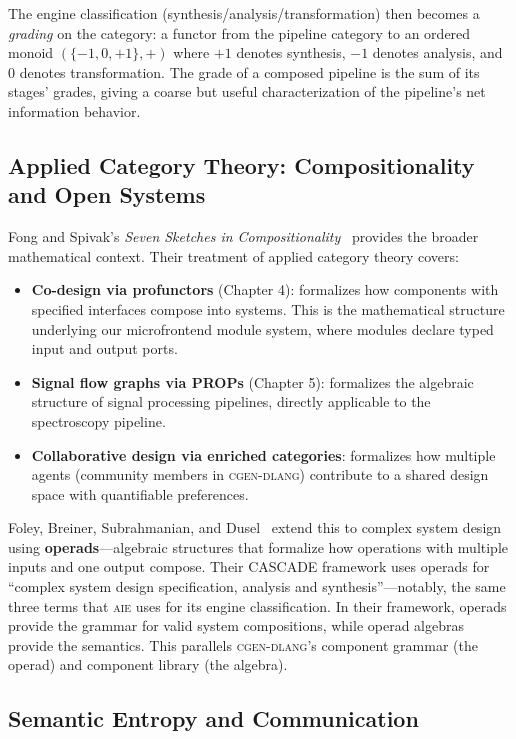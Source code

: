 \documentclass[11pt,letterpaper]{article}
\newcommand{\keyword}[1]{\textbf{\textcolor{accentpurple}{#1}}}
\newcommand{\aie}{\textsc{aie}}
\newcommand{\cgen}{\textsc{cgen-dlang}}
\begin{document}
The engine classification (synthesis/analysis/transformation) then becomes a \textit{grading} on the category: a functor from the pipeline category to an ordered monoid $(\{-1, 0, +1\}, +)$ where $+1$ denotes synthesis, $-1$ denotes analysis, and $0$ denotes transformation. The grade of a composed pipeline is the sum of its stages' grades, giving a coarse but useful characterization of the pipeline's net information behavior.

\subsection{Applied Category Theory: Compositionality and Open Systems}

Fong and Spivak's \textit{Seven Sketches in Compositionality}~\cite{fong2019} provides the broader mathematical context. Their treatment of applied category theory covers:

\begin{itemize}[leftmargin=*]
  \item \textbf{Co-design via profunctors} (Chapter 4): formalizes how components with specified interfaces compose into systems. This is the mathematical structure underlying our microfrontend module system, where modules declare typed input and output ports.
  \item \textbf{Signal flow graphs via PROPs} (Chapter 5): formalizes the algebraic structure of signal processing pipelines, directly applicable to the spectroscopy pipeline.
  \item \textbf{Collaborative design via enriched categories}: formalizes how multiple agents (community members in \cgen{}) contribute to a shared design space with quantifiable preferences.
\end{itemize}

Foley, Breiner, Subrahmanian, and Dusel~\cite{foley2021} extend this to complex system design using \keyword{operads}---algebraic structures that formalize how operations with multiple inputs and one output compose. Their CASCADE framework uses operads for ``complex system design specification, analysis and synthesis''---notably, the same three terms that \aie{} uses for its engine classification. In their framework, operads provide the grammar for valid system compositions, while operad algebras provide the semantics. This parallels \cgen{}'s component grammar (the operad) and component library (the algebra).

\subsection{Semantic Entropy and Communication}
\end{document}
